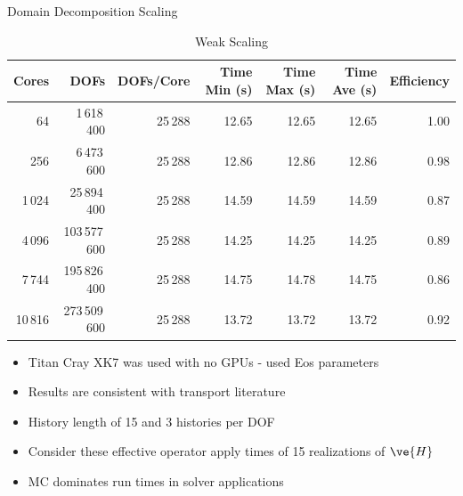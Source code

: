 \documentclass{beamer}
\begin{document}
\begin{frame}{Domain Decomposition Scaling}
  \begin{table}[htb!]
    \tiny
    \begin{center}
      \begin{tabular}{rrrrrrr}
        \toprule
        \multicolumn{1}{r}{Cores} &
        \multicolumn{1}{r}{DOFs} &
        \multicolumn{1}{r}{DOFs/Core} &
        \multicolumn{1}{r}{Time Min (s)} &
        \multicolumn{1}{r}{Time Max (s)} &
        \multicolumn{1}{r}{Time Ave (s)} &
        \multicolumn{1}{r}{Efficiency}
        \\ \midrule
        64 & 1\,618\,400 & 25\,288 & 12.65 & 12.65 & 12.65 & 1.00 \\
        256 & 6\,473\,600 & 25\,288 & 12.86 & 12.86 & 12.86 & 0.98 \\
        1\,024 & 25\,894\,400 & 25\,288 & 14.59 & 14.59 & 14.59 & 0.87 \\
        4\,096 & 103\,577\,600 & 25\,288 & 14.25 & 14.25 & 14.25 & 0.89 \\
        7\,744 & 195\,826\,400 & 25\,288 & 14.75 & 14.78 & 14.75 & 0.86 \\
        10\,816 & 273\,509\,600 & 25\,288 & 13.72 & 13.72 & 13.72 & 0.92 \\
        \bottomrule
      \end{tabular}
    \end{center}
        \vspace{-0.07in}
    \caption{\small Weak Scaling}
  \end{table}

  \vspace{-0.25in}

  \begin{itemize}
    \small
  \item Titan Cray XK7 was used with no GPUs - used Eos parameters
  \item Results are consistent with transport literature
  \item History length of 15 and 3 histories per DOF
  \item Consider these effective operator apply times of 15 realizations of
    $\ve{H}$
  \item MC dominates run times in solver applications
  \end{itemize}

\end{frame}

\end{document}
